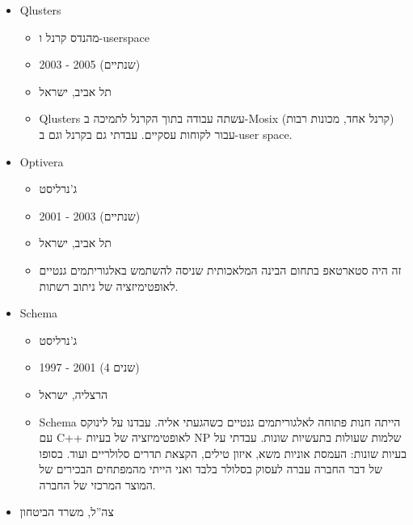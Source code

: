 \documentclass[
  hebrew,
]{article}
\providecommand{\tightlist}{%
  \setlength{\itemsep}{0pt}\setlength{\parskip}{0pt}}
\begin{document}
\begin{itemize}
  \begin{itemize}
  \tightlist
  \item
    CTO
  \item
    2005 - אוגוסט 2016 (11 שנים)
  \item
    רעננה, ישראל
  \item
    עשינו עבודות קבלנות משנה בתחומים שונים עם התמחות במיגרציה ללינוקס
    מכל דבר. שימו לב - הכוונה למיגרציה אל לינוקס, לא מ- לינוקס. אנחנו
    כותבים דרייברים ללינוקס, עוזרים בסוגיות זמן אמת, מציעים ייעוץ,
    קורסים, שירותי מיגרציית קוד מפלטפורמות אחרות ועוד. אנחנו עושים גם
    פרויקטי web מסוגים שונים. עבדנו עם כמה מהחברות הגדולות בישראל:
    אמדוקס, אינטל, IBM, צ'קפוינט.
  \end{itemize}
\item
  Qlusters

  \begin{itemize}
  \tightlist
  \item
    מהנדס קרנל ו-userspace
  \item
    2003 - 2005 (שנתיים)
  \item
    תל אביב, ישראל
  \item
    Qlusters עשתה עבודה בתוך הקרנל לתמיכה ב-Mosix (קרנל אחד, מכונות
    רבות) עבור לקוחות עסקיים. עבדתי גם בקרנל וגם ב-user space.
  \end{itemize}
\item
  Optivera

  \begin{itemize}
  \tightlist
  \item
    ג'נרליסט
  \item
    2001 - 2003 (שנתיים)
  \item
    תל אביב, ישראל
  \item
    זה היה סטארטאפ בתחום הבינה המלאכותית שניסה להשתמש באלגוריתמים גנטיים
    לאופטימיזציה של ניתוב רשתות.
  \end{itemize}
\item
  Schema

  \begin{itemize}
  \tightlist
  \item
    ג'נרליסט
  \item
    1997 - 2001 (4 שנים)
  \item
    הרצליה, ישראל
  \item
    Schema הייתה חנות פתוחה לאלגוריתמים גנטיים כשהגעתי אליה. עבדנו על
    לינוקס עם C++ לאופטימיזציה של בעיות NP שלמות שעולות בתעשיות שונות.
    עבדתי על בעיות שונות: העמסת אוניות משא, איזון טילים, הקצאת תדרים
    סלולריים ועוד. בסופו של דבר החברה עברה לעסוק בסלולר בלבד ואני הייתי
    מהמפתחים הבכירים של המוצר המרכזי של החברה.
  \end{itemize}
\item
  צה''ל, משרד הביטחון


\end{itemize}
\end{document}
